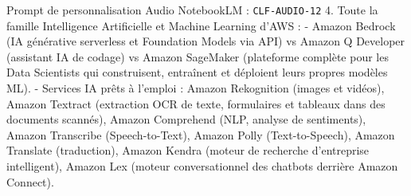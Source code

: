 \documentclass[11pt,a4paper]{article}
\begin{document}
\begin{promptbox}{Prompt de personnalisation Audio NotebookLM : \texttt{CLF-AUDIO-12}}
4. Toute la famille Intelligence Artificielle et Machine Learning d'AWS :
- Amazon Bedrock (IA générative serverless et Foundation Models via API) vs Amazon Q Developer (assistant IA de codage) vs Amazon SageMaker (plateforme complète pour les Data Scientists qui construisent, entraînent et déploient leurs propres modèles ML).
- Services IA prêts à l'emploi : Amazon Rekognition (images et vidéos), Amazon Textract (extraction OCR de texte, formulaires et tableaux dans des documents scannés), Amazon Comprehend (NLP, analyse de sentiments), Amazon Transcribe (Speech-to-Text), Amazon Polly (Text-to-Speech), Amazon Translate (traduction), Amazon Kendra (moteur de recherche d'entreprise intelligent), Amazon Lex (moteur conversationnel des chatbots derrière Amazon Connect).
\end{promptbox}
\end{document}
